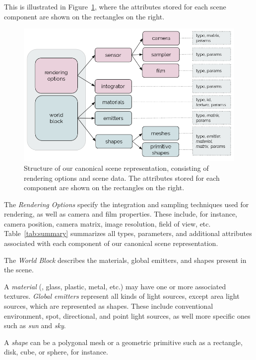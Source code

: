 This is illustrated in Figure~\ref{fig:canonicalrep}, where the attributes stored for each scene component are shown on the rectangles on the right.

\begin{figure}[h]
  \includegraphics[width=\textwidth,height=\textheight,keepaspectratio]{images/4_system_architecture/canonicalrep.png}
  \caption{Structure of our canonical scene representation, consisting of rendering options and scene data. The attributes stored for each component are shown on the rectangles on the right.}
  \label{fig:canonicalrep}
\end{figure}

The \textit{Rendering Options} specify the integration and sampling techniques used for rendering, as well as camera and film properties. These include, for instance, camera position, camera matrix, image resolution, field of view, etc. Table~\ref{tab:summary} summarizes all types, parameters, and additional attributes associated with each component of our canonical scene representation. 

The \textit{World Block} describes the materials, global emitters, and shapes present in the scene.

A {\it material} (\eg, glass, plastic, metal, etc.) may have one or more associated textures. {\it Global emitters} represent all kinds of light sources, except area light sources, which are represented as shapes. These include conventional environment, spot, directional, and point light sources, as well more specific ones such as {\it sun} and {\it sky}.

A {\it shape} can be a polygonal mesh or a geometric primitive such as a rectangle, disk, cube, or sphere, for instance. 

